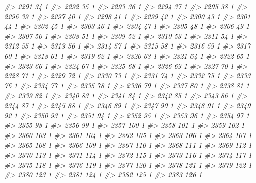 \documentclass[]{article}
\newenvironment{Shaded}{\begin{snugshade}}{\end{snugshade}}
\newcommand{\CommentTok}[1]{\textcolor[rgb]{0.56,0.35,0.01}{\textit{#1}}}
\begin{document}
\begin{Shaded}
\begin{Highlighting}[]
\CommentTok{#> 2291  34  1}
\CommentTok{#> 2292  35  1}
\CommentTok{#> 2293  36  1}
\CommentTok{#> 2294  37  1}
\CommentTok{#> 2295  38  1}
\CommentTok{#> 2296  39  1}
\CommentTok{#> 2297  40  1}
\CommentTok{#> 2298  41  1}
\CommentTok{#> 2299  42  1}
\CommentTok{#> 2300  43  1}
\CommentTok{#> 2301  44  1}
\CommentTok{#> 2302  45  1}
\CommentTok{#> 2303  46  1}
\CommentTok{#> 2304  47  1}
\CommentTok{#> 2305  48  1}
\CommentTok{#> 2306  49  1}
\CommentTok{#> 2307  50  1}
\CommentTok{#> 2308  51  1}
\CommentTok{#> 2309  52  1}
\CommentTok{#> 2310  53  1}
\CommentTok{#> 2311  54  1}
\CommentTok{#> 2312  55  1}
\CommentTok{#> 2313  56  1}
\CommentTok{#> 2314  57  1}
\CommentTok{#> 2315  58  1}
\CommentTok{#> 2316  59  1}
\CommentTok{#> 2317  60  1}
\CommentTok{#> 2318  61  1}
\CommentTok{#> 2319  62  1}
\CommentTok{#> 2320  63  1}
\CommentTok{#> 2321  64  1}
\CommentTok{#> 2322  65  1}
\CommentTok{#> 2323  66  1}
\CommentTok{#> 2324  67  1}
\CommentTok{#> 2325  68  1}
\CommentTok{#> 2326  69  1}
\CommentTok{#> 2327  70  1}
\CommentTok{#> 2328  71  1}
\CommentTok{#> 2329  72  1}
\CommentTok{#> 2330  73  1}
\CommentTok{#> 2331  74  1}
\CommentTok{#> 2332  75  1}
\CommentTok{#> 2333  76  1}
\CommentTok{#> 2334  77  1}
\CommentTok{#> 2335  78  1}
\CommentTok{#> 2336  79  1}
\CommentTok{#> 2337  80  1}
\CommentTok{#> 2338  81  1}
\CommentTok{#> 2339  82  1}
\CommentTok{#> 2340  83  1}
\CommentTok{#> 2341  84  1}
\CommentTok{#> 2342  85  1}
\CommentTok{#> 2343  86  1}
\CommentTok{#> 2344  87  1}
\CommentTok{#> 2345  88  1}
\CommentTok{#> 2346  89  1}
\CommentTok{#> 2347  90  1}
\CommentTok{#> 2348  91  1}
\CommentTok{#> 2349  92  1}
\CommentTok{#> 2350  93  1}
\CommentTok{#> 2351  94  1}
\CommentTok{#> 2352  95  1}
\CommentTok{#> 2353  96  1}
\CommentTok{#> 2354  97  1}
\CommentTok{#> 2355  98  1}
\CommentTok{#> 2356  99  1}
\CommentTok{#> 2357 100  1}
\CommentTok{#> 2358 101  1}
\CommentTok{#> 2359 102  1}
\CommentTok{#> 2360 103  1}
\CommentTok{#> 2361 104  1}
\CommentTok{#> 2362 105  1}
\CommentTok{#> 2363 106  1}
\CommentTok{#> 2364 107  1}
\CommentTok{#> 2365 108  1}
\CommentTok{#> 2366 109  1}
\CommentTok{#> 2367 110  1}
\CommentTok{#> 2368 111  1}
\CommentTok{#> 2369 112  1}
\CommentTok{#> 2370 113  1}
\CommentTok{#> 2371 114  1}
\CommentTok{#> 2372 115  1}
\CommentTok{#> 2373 116  1}
\CommentTok{#> 2374 117  1}
\CommentTok{#> 2375 118  1}
\CommentTok{#> 2376 119  1}
\CommentTok{#> 2377 120  1}
\CommentTok{#> 2378 121  1}
\CommentTok{#> 2379 122  1}
\CommentTok{#> 2380 123  1}
\CommentTok{#> 2381 124  1}
\CommentTok{#> 2382 125  1}
\CommentTok{#> 2383 126  1}

\end{Highlighting}
\end{Shaded}
\end{document}
